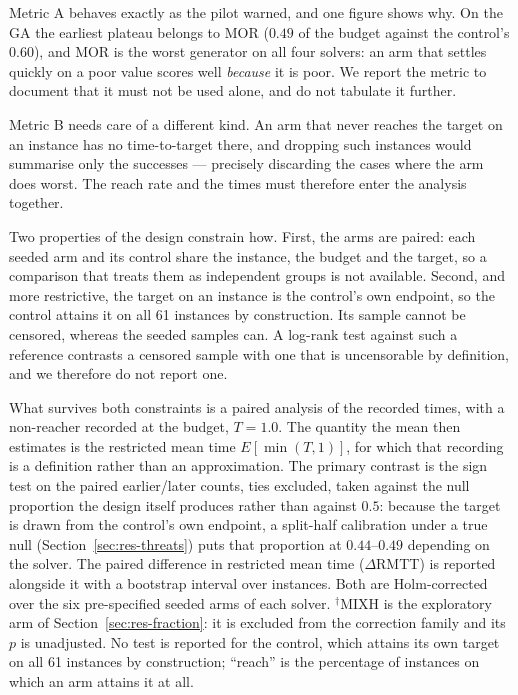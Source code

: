 \documentclass[review]{elsarticle}
\begin{document}
Metric A behaves exactly as the pilot warned, and one figure shows why. On
the GA the earliest plateau belongs to MOR ($0.49$ of the budget against the
control's $0.60$), and MOR is the worst generator on all four solvers: an
arm that settles quickly on a poor value scores well \emph{because} it is
poor. We report the metric to document that it must not be used alone, and
do not tabulate it further.

Metric B needs care of a different kind. An arm that never reaches the
target on an instance has no time-to-target there, and dropping such
instances would summarise only the successes --- precisely discarding the
cases where the arm does worst. The reach rate and the times must therefore
enter the analysis together.

Two properties of the design constrain how. First, the arms are paired:
each seeded arm and its control share the instance, the budget and the
target, so a comparison that treats them as independent groups is not
available. Second, and more restrictive, the target on an instance is the
control's own endpoint, so the control attains it on all 61 instances by
construction. Its sample cannot be censored, whereas the seeded samples
can. A log-rank test against such a reference contrasts a censored sample
with one that is uncensorable by definition, and we therefore do not report
one.

What survives both constraints is a paired analysis of the recorded times,
with a non-reacher recorded at the budget, $T=1.0$. The quantity the mean
then estimates is the restricted mean time $E[\min(T,1)]$, for which that
recording is a definition rather than an approximation. The primary
contrast is the sign test on the paired earlier/later counts, ties
excluded, taken against the null proportion the design itself produces
rather than against $0.5$: because the target is drawn from the control's
own endpoint, a split-half calibration under a true null
(Section~\ref{sec:res-threats}) puts that proportion at $0.44$--$0.49$
depending on the solver. The paired difference in restricted mean time
($\Delta$RMTT) is reported alongside it with a bootstrap interval over
instances. Both are Holm-corrected over the six pre-specified seeded arms of
each solver. $^{\dagger}$MIXH is the exploratory arm of
Section~\ref{sec:res-fraction}: it is excluded from the correction family
and its $p$ is unadjusted.
No test is reported for the control, which attains its own target on all 61
instances by construction; ``reach'' is the percentage of instances on
which an arm attains it at all.
\end{document}
